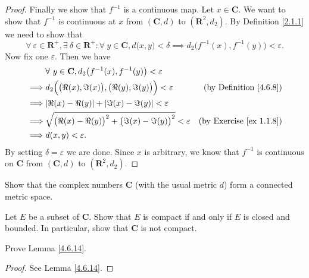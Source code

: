 \begin{proof}
    Finally we show that \(f^{-1}\) is a continuous map.
    Let \(x \in \mathbf{C}\).
    We want to show that \(f^{-1}\) is continuous at \(x\) from \((\mathbf{C}, d)\) to \((\mathbf{R}^2, d_2)\).
    By Definition \ref{2.1.1} we need to show that
    \[
        \forall\ \varepsilon \in \mathbf{R}^+, \exists\ \delta \in \mathbf{R}^+ : \forall\ y \in \mathbf{C}, d\big(x, y\big) < \delta \implies d_2\big(f^{-1}(x), f^{-1}(y)\big) < \varepsilon.
    \]
    Now fix one \(\varepsilon\).
    Then we have
    \begin{align*}
                 & \forall\ y \in \mathbf{C}, d_2\big(f^{-1}(x), f^{-1}(y)\big) < \varepsilon                                           \\
        \implies & d_2\Big(\big(\Re(x), \Im(x)\big), \big(\Re(y), \Im(y)\big)\Big) < \varepsilon  & \text{(by Definition \ref{4.6.8})}  \\
        \implies & \abs*{\Re(x) - \Re(y)} + \abs*{\Im(x) - \Im(y)} < \varepsilon                                                        \\
        \implies & \sqrt{\big(\Re(x) - \Re(y)\big)^2 + \big(\Im(x) - \Im(y)\big)^2} < \varepsilon & \text{(by Exercise \ref{ex 1.1.8})} \\
        \implies & d(x, y) < \varepsilon.
    \end{align*}
    By setting \(\delta = \varepsilon\) we are done.
    Since \(x\) is arbitrary, we know that \(f^{-1}\) is continuous on \(\mathbf{C}\) from \((\mathbf{C}, d)\) to \((\mathbf{R}^2, d_2)\).
\end{proof}

\begin{exercise}\label{ex 4.6.12}
    Show that the complex numbers \(\mathbf{C}\) (with the usual metric \(d\)) form a connected metric space.
\end{exercise}

\begin{exercise}\label{ex 4.6.13}
    Let \(E\) be a subset of \(\mathbf{C}\).
    Show that \(E\) is compact if and only if \(E\) is closed and bounded.
    In particular, show that \(\mathbf{C}\) is not compact.
\end{exercise}

\begin{exercise}\label{ex 4.6.14}
    Prove Lemma \ref{4.6.14}.
\end{exercise}

\begin{proof}
    See Lemma \ref{4.6.14}.
\end{proof}

